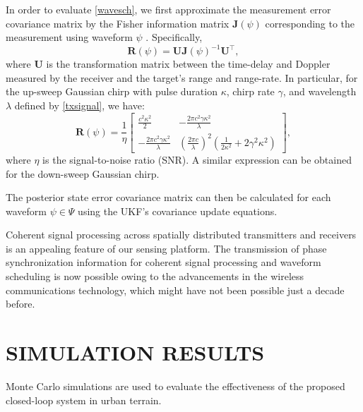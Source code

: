 \documentclass[times]{asjcauth}
\begin{document}
In order to evaluate \eqref{wavesch}, we first approximate the measurement error covariance matrix by the Fisher information matrix $\mathbf{J}(\psi)$ corresponding to the measurement using waveform $\psi$ \cite{Evans,VanTrees}. Specifically,
\begin{equation*}
\mathbf{R}(\psi) = \mathbf{U}\mathbf{J}(\psi)^{-1}\mathbf{U}^{\top},
\end{equation*}
\noindent where $\mathbf{U}$ is the transformation matrix between the time-delay and Doppler measured by the receiver and the target's range and range-rate. In particular, for the up-sweep Gaussian chirp with pulse duration $\kappa$, chirp rate $\gamma$, and wavelength $\lambda$ defined by \eqref{txsignal}, we have:
\begin{equation*}
\mathbf{R}(\psi) = \frac{1}{\eta}\left[\begin{array}{cc}
                     \frac{c^{2}\kappa^{2}}{2} & -\frac{2\pi c^{2}\gamma\kappa^{2}}{\lambda} \\
                     -\frac{2\pi c^{2}\gamma\kappa^{2}}{\lambda} & \left(\frac{2\pi c}{\lambda}\right)^{2}\left(\frac{1}{2\kappa^{2}}+2\gamma^{2}\kappa^{2}\right)
                   \end{array}\right],
\end{equation*}
\noindent where $\eta$ is the signal-to-noise ratio (SNR). A similar expression can be obtained for the down-sweep Gaussian chirp.

The posterior state error covariance matrix can then be calculated for each waveform $\psi\in\Psi$ using the UKF's covariance update equations.

Coherent signal processing across spatially distributed transmitters and receivers is an appealing feature of our sensing platform. The transmission of phase synchronization information for coherent signal processing and waveform scheduling is now possible owing to the advancements in the wireless communications technology, which might have not been possible just a decade before.

\section{SIMULATION RESULTS}
\label{secsimulation}

Monte Carlo simulations are used to evaluate the effectiveness of the proposed closed-loop system in urban terrain.
\end{document}
